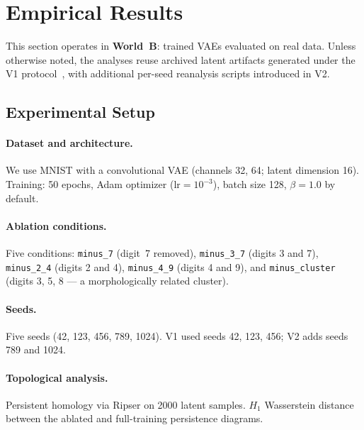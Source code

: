 \documentclass[11pt]{article}
\begin{document}
\section{Empirical Results}
\label{sec:results}

This section operates in \textbf{World~B}: trained VAEs evaluated on real
data.
Unless otherwise noted, the analyses reuse archived latent artifacts generated
under the V1 protocol~\citep{rigaud2026gap}, with additional per-seed
reanalysis scripts introduced in V2.

\subsection{Experimental Setup}
\label{sec:setup}

\paragraph{Dataset and architecture.}
We use MNIST with a convolutional VAE (channels 32, 64; latent dimension 16).
Training: 50 epochs, Adam optimizer ($\text{lr} = 10^{-3}$), batch size 128,
$\beta = 1.0$ by default.

\paragraph{Ablation conditions.}
Five conditions: \texttt{minus\_7} (digit~7 removed),
\texttt{minus\_3\_7} (digits 3 and 7), \texttt{minus\_2\_4} (digits 2 and 4),
\texttt{minus\_4\_9} (digits 4 and 9), and \texttt{minus\_cluster}
(digits 3, 5, 8 --- a morphologically related cluster).

\paragraph{Seeds.}
Five seeds (42, 123, 456, 789, 1024).
V1 used seeds 42, 123, 456; V2 adds seeds 789 and 1024.

\paragraph{Topological analysis.}
Persistent homology via Ripser on 2000 latent samples.
$H_1$ Wasserstein distance between the ablated and full-training persistence
diagrams.
\end{document}
